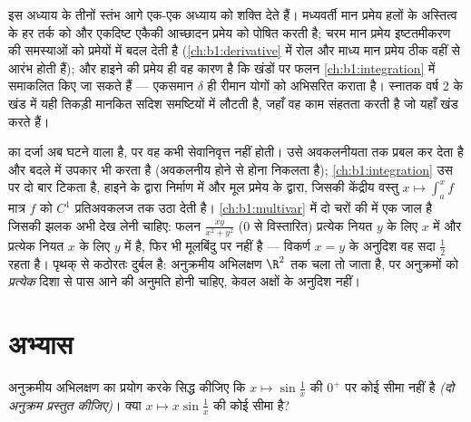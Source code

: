 \begin{remark}[ये प्रमेयें आगे कहाँ काम करती हैं]
इस अध्याय के तीनों स्तंभ आगे एक-एक अध्याय को शक्ति देते हैं। मध्यवर्ती मान
प्रमेय हलों के अस्तित्व के हर तर्क को और एकदिष्ट एकैकी आच्छादन प्रमेय को
पोषित करती है; चरम मान प्रमेय इष्टतमीकरण की समस्याओं को प्रमेयों में बदल
देती है (\cref{ch:b1:derivative} में रोल और माध्य मान प्रमेय ठीक वहीं से
आरंभ होती हैं); और हाइने की प्रमेय ही वह कारण है कि खंडों पर  फलन
\cref{ch:b1:integration} में समाकलित किए जा सकते हैं --- एकसमान $\delta$ ही
रीमान योगों को अभिसरित कराता है। स्नातक वर्ष 2 के खंड में यही तिकड़ी मानकित
सदिश समष्टियों में लौटती है, जहाँ वह काम संहतता करती है जो यहाँ खंड करते
हैं।
\end{remark}

\begin{remark}[इस खंड के भीतर आगे की दृष्टि]
 का दर्जा अब घटने वाला है, पर वह कभी सेवानिवृत्त नहीं होती।
 उसे अवकलनीयता तक प्रबल कर देता है और बदले में उपकार
भी करता है (अवकलनीय होने से  होना निकलता है); \cref{ch:b1:integration}
उस पर दो बार टिकता है, हाइने के द्वारा निर्माण में और मूल प्रमेय के द्वारा,
जिसकी केंद्रीय वस्तु $x \mapsto \int_a^x f$ मात्र  $f$ को $C^1$
प्रतिअवकलज तक उठा देती है। \cref{ch:b1:multivar} में दो चरों की  में
एक जाल है जिसकी झलक अभी देख लेनी चाहिए: फलन $\frac{xy}{x^2 + y^2}$ ($0$ से
विस्तारित) प्रत्येक नियत $y$ के लिए $x$ में और प्रत्येक नियत $x$ के लिए $y$
में  है, फिर भी मूलबिंदु पर  नहीं है --- विकर्ण $x = y$ के अनुदिश वह
सदा $\frac12$ रहता है। पृथक्   से कठोरतः दुर्बल है: अनुक्रमीय
अभिलक्षण $\R^2$ तक चला तो जाता है, पर अनुक्रमों को \emph{प्रत्येक} दिशा से
पास आने की अनुमति होनी चाहिए, केवल अक्षों के अनुदिश नहीं।
\end{remark}

\section{अभ्यास}

\begin{exercise}[$\star$]\label{exo:b1:continuity:1}
अनुक्रमीय अभिलक्षण का प्रयोग करके सिद्ध कीजिए कि $x \mapsto \sin\frac 1x$ की
$0^+$ पर कोई सीमा नहीं है \emph{(दो अनुक्रम प्रस्तुत कीजिए)}। क्या $x
\mapsto x \sin\frac 1x$ की कोई सीमा है?
\end{exercise}

